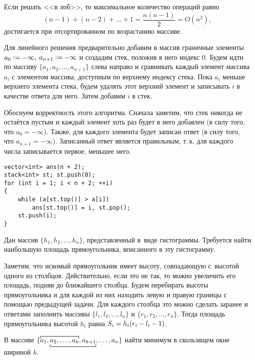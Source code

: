 Если решать <<в лоб>>, то максимальное количество операций равно 
\[(n - 1) + (n - 2) + \ldots + 1 = \frac{n(n - 1)}{2} = O(n^2),\]
достигается при отсортированном по возрастанию массиве.

Для линейного решения предварительно добавим в массив граничные элементы $a_0 \vcentcolon = -\infty$, $a_{n + 1} \vcentcolon = -\infty$ и создадим стек, положив в него индекс $0$. Будем идти по массиву $\{a_1, a_2, \ldots, a_{n + 1}\}$ слева направо и \mbox{сравнивать} каждый элемент массива $a_i$ с элементом массива, доступным по \mbox{верхнему} индексу стека. Пока $a_i$ меньше верхнего элемента стека, будем удалять этот верхний элемент и записывать $i$ в качестве ответа для него. Затем добавим $i$ в стек.

Обоснуем корректность этого алгоритма. Сначала заметим, что стек никогда не остаётся пустым и каждый элемент хоть раз будет в него добавлен (в силу того, что $a_0 = -\infty$). Также, для каждого элемента будет записан ответ (в силу того, что $a_{n + 1} = -\infty$). Записанный ответ является правильным, т.\,к. для каждого числа записывается первое, меньшее него.

\begin{verbatim}
vector<int> ans(n + 2);
stack<int> st; st.push(0);
for (int i = 1; i < n + 2; ++i)
{
    while (a[st.top()] > a[i])
        ans[st.top()] = i, st.pop();
    st.push(i);
}
\end{verbatim}

\begin{problem}[Гистограмма]
    Дан массив $\{h_1, h_2, \ldots, h_n\}$, представленный в~виде гистограммы. Требуется найти наибольшую площадь прямоугольника, вписанного в эту гистограмму.
\end{problem}

Заметим, что искомый прямоугольник имеет высоту, совпадающую с~высотой одного из столбцов. Действительно, если это не так, то можно увеличить его площадь, подняв до ближайшего столбца. Будем перебирать высоты прямоугольника и для каждой из них находить левую и правую границы с помощью предыдущей задачи. Для каждого столбца это можно сделать заранее и ответами заполнить \mbox{массивы} $\{l_1, l_2, \ldots, l_n\}$ и $\{r_1, r_2, \ldots, r_n\}$. Тогда площадь прямоугольника высотой $h_i$ равна $S_i \hm = h_i(r_i - l_i - 1)$.

\begin{problem}
    В массиве $\{\rlap{$\overbracket[.2mm]{\phantom{a_1, a_2, \ldots, a_k}}$}a_1, \underbracket[.2mm]{a_2, \ldots, a_k, a_{k + 1}}, \ldots, a_n\}$ найти минимум в скользящем окне шириной $k$.
\end{problem}

